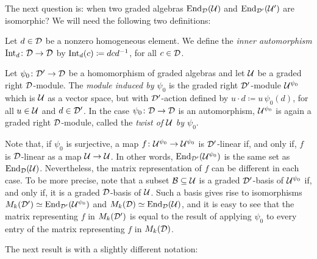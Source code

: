 The next question is: when two graded algebras $\operatorname{End}_{\mathcal{D}} (\mathcal U)$ and $\operatorname{End}_{\mathcal{D}'} (\mathcal U')$ are isomorphic? 
We will need the following two definitions:

\begin{defi}\label{def:inner-automorphism}
	Let $d\in \mathcal{D}$ be a nonzero homogeneous element.
	We define the \emph{inner automorphism} $\operatorname{Int}_d\colon \mathcal{D} \to \mathcal{D}$ by $\operatorname{Int}_d (c) \coloneqq dcd^{-1}$, for all $c\in \mathcal{D}$.
\end{defi}

\begin{defi}\label{def:twist}
	Let $\psi_0\colon \mathcal{D}' \to \mathcal{D}$ be a homomorphism of graded algebras and let $\mathcal U$ be a graded right $\mathcal{D}$-module.
	The \emph{module induced by $\psi_0$} is the graded right $\mathcal{D}'$-module $\mathcal U^{\psi_0}$ which is $\mathcal U$ as a vector space, but with $\mathcal{D}'$-action defined by $u\cdot d \coloneqq u\,\psi_0 (d)$, for all $u\in \mathcal U$ and $d\in \mathcal{D}'$.
	In the case $\psi_0\colon \mathcal{D} \to \mathcal{D}$ is an automorphism, $\mathcal U^{\psi_0}$ is again a graded right $\mathcal{D}$-module, called the \emph{twist of $\mathcal U$ by $\psi_0$}.
\end{defi}

\begin{remark}\label{rmk:twist-does-not-change-set}
	Note that, if $\psi_0$ is surjective, a map $f\colon \mathcal U^{\psi_0} \to \mathcal U^{\psi_0}$ is $\mathcal{D}'$-linear if, and only if, $f$ is $\mathcal{D}$-linear as a map $\mathcal U\to \mathcal U$. 
	In other words, $\operatorname{End}_{\mathcal{D}'} (\mathcal U^{\psi_0})$ is the same set as $\operatorname{End}_{\mathcal{D}} (\mathcal U)$. 
	Nevertheless, the matrix representation of $f$ can be different in each case. 
	To be more precise, note that a subset $\mathcal B \subseteq \mathcal U$ is a graded $\mathcal{D}'$-basis of $\mathcal U^{\psi_0}$ if, and only if, it is a graded $\mathcal{D}$-basis of $\mathcal U$. 
	Such a basis gives rise to isomorphisms $M_k(\mathcal{D}') \simeq \operatorname{End}_{\mathcal{D}'} (\mathcal U^{\psi_0})$ and $M_k(\mathcal{D}) \simeq \operatorname{End}_{\mathcal{D}} (\mathcal U)$, and it is easy to see that the matrix representing $f$ in $M_k(\mathcal{D}')$ is equal to the result of applying $\psi_0$ to every entry of the matrix representing $f$ in $M_k(\mathcal{D})$.
\end{remark}

The next result is \cite[Theorem 2.10]{livromicha} with a slightly different notation:

